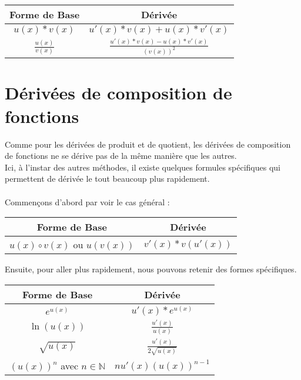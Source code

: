 \documentclass{article}
\begin{document}
	\begin{center}
		 \begin{tabular}{|c|c|}
			 \hline
			 Forme de Base & Dérivée \\
			 \hline
			 $u(x)*v(x)$ & $u'(x)*v(x)+u(x)*v'(x)$ \\
			 \hline
			 $\frac{u(x)}{v(x)}$ & $\frac{u'(x)*v(x)-u(x)*v'(x)}{(v(x))^2}$ \\
			 \hline
		 \end{tabular}
	\end{center}

	\section{Dérivées de composition de fonctions}

	Comme pour les dérivées de produit et de quotient, les dérivées de composition de fonctions ne se dérive pas de la même manière que les autres. \\
	Ici, à l'instar des autres méthodes, il existe quelques formules spécifiques qui permettent de dérivée le tout beaucoup plus rapidement. \\
	\\
	Commençons d'abord par voir le cas général :
	\begin{center}
		 \begin{tabular}{|c|c|}
			 \hline
			 Forme de Base & Dérivée \\
			 \hline
			 $u(x)\circ v(x)$ ou $u(v(x))$ & $v'(x)*v(u'(x))$ \\
			 \hline
		 \end{tabular}
	\end{center}
	Ensuite, pour aller plus rapidement, nous pouvons retenir des formes spécifiques. \\
	\begin{center}
		 \begin{tabular}{|c|c|}
			 \hline
			 Forme de Base & Dérivée \\
			 \hline
			 $e^{u(x)}$ & $u'(x)*e^{u(x)}$ \\
			 \hline
			 $\ln (u(x))$ & $\frac{u'(x)}{u(x)}$ \\
			 \hline
			 $\sqrt{u(x)}$ & $\frac{u'(x)}{2\sqrt{u(x)}}$ \\
			 \hline
			 $(u(x))^n$ avec $n \in \mathbb{N}$ & $nu'(x)(u(x))^{n-1}$ \\
			 \hline
		 \end{tabular}
	\end{center}
\end{document}
